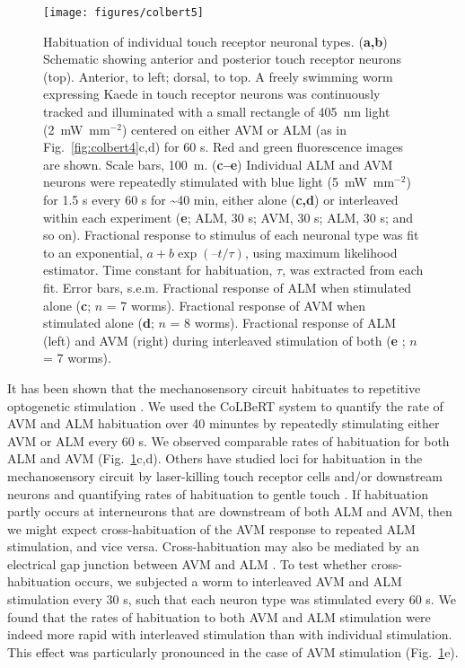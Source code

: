 \begin{figure} 
\texttt{[image: figures/colbert5]}
\caption[Habituation of individual touch receptor neuronal types.]{ Habituation of individual touch receptor neuronal types. (\textbf{a,b}) Schematic showing anterior and posterior touch receptor neurons (top). Anterior, to left; dorsal, to top. A freely swimming worm expressing Kaede in touch receptor neurons was continuously tracked and illuminated with a small rectangle of 405~nm light (2~mW~mm$^{-2}$) centered on either AVM or ALM (as in Fig.~\ref{fig:colbert4}c,d) for 60 s. Red and green fluorescence images are shown. Scale bars, 100~\textmu m. (\textbf{c–e}) Individual ALM and AVM neurons were repeatedly stimulated with blue light (5~mW~mm$^{-2}$) for 1.5 s every 60 s for \textasciitilde40 min, either alone (\textbf{c,d}) or interleaved within each experiment (\textbf{e}; ALM, 30 s; AVM, 30 s; ALM, 30 s; and so on). Fractional response to stimulus of each neuronal type was fit to an exponential, $a + b \exp(–t/\tau)$, using maximum likelihood estimator. Time constant for habituation, $\tau$, was extracted from each fit. Error bars, s.e.m. Fractional response of ALM when stimulated alone (\textbf{c}; $n$ = 7 worms). Fractional response of AVM when stimulated alone (\textbf{d}; $n$ = 8 worms). Fractional response of ALM (left) and AVM (right) during interleaved stimulation of both (\textbf{e} ; $n$ = 7 worms).\label{fig:colbert5}}
\end{figure}
\afterpage{\clearpage}


It has been shown that the mechanosensory circuit habituates to repetitive optogenetic stimulation \citep{nagel_light_2005}. We used the CoLBeRT system to quantify the rate of AVM and ALM habituation over 40 minuntes by repeatedly stimulating either AVM or ALM every 60 s. We observed comparable rates of habituation for both ALM and AVM (Fig.~\ref{fig:colbert5}c,d). Others have studied loci for habituation in the mechanosensory circuit by laser-killing touch receptor cells and/or downstream neurons and quantifying rates of habituation to gentle touch \citep{wyart_optogenetic_2009}. If habituation partly occurs at interneurons that are downstream of both ALM and AVM, then we might expect cross-habituation of the AVM response to repeated ALM stimulation, and vice versa. Cross-habituation may also be mediated by an electrical gap junction between AVM and ALM \citep{white_structure_1976}. To test whether cross-habituation occurs, we subjected a worm to interleaved AVM and ALM stimulation every 30 s, such that each neuron type was stimulated every 60 s. We found that the rates of habituation to both AVM and ALM stimulation were indeed more rapid with interleaved stimulation than with individual stimulation. This effect was particularly pronounced in the case of AVM stimulation (Fig.~\ref{fig:colbert5}e).

